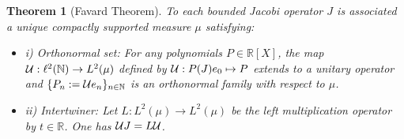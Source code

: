 \documentclass[10pt]{book}
\theoremstyle{break}
\newtheorem{theorem}{Theorem}
\begin{document}
\begin{theorem} [Favard Theorem]
To each bounded Jacobi operator $J$ is associated a unique compactly supported measure $\mu$ satisfying:
\begin{itemize}
\vspace*{-4pt}
\setlength{\itemsep}{-1pt}
\item i) Orthonormal set:  For any polynomials $P\in\mathbb{R}[X]$, the map ${\cal{U}}:\ell^2(\mathbb{N})\to L^2(\mu)$ defined by ${\cal{U}}:P(J)e_0\mapsto P$ extends to a unitary operator and $\{P_n:={\cal{U}}e_n\}_{n\in\mathbb{N}}$ is an orthonormal family with respect to $\mu$.
\item ii) Intertwiner: Let $L:L^2(\mu)\to L^2(\mu)$ be the left multiplication operator by $t\in\mathbb{R}$. One has ${\cal{U}}J=L\cal{U}$.
\end{itemize}
\end{theorem}
\end{document}
